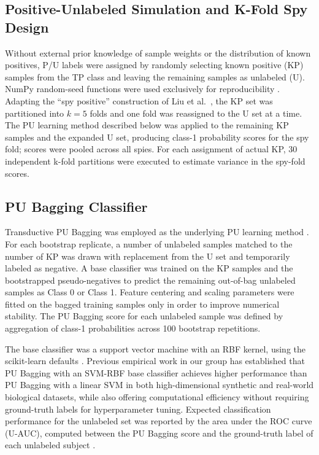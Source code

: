 \documentclass[11pt]{article}
\begin{document}
\subsection{Positive-Unlabeled Simulation and K-Fold Spy Design}

Without external prior knowledge of sample weights or the distribution of known positives, P/U labels were assigned by randomly selecting known positive (KP) samples from the TP class and leaving the remaining samples as unlabeled (U). NumPy random-seed functions were used exclusively for reproducibility \cite{harris2020numpy}. Adapting the ``spy positive'' construction of Liu et al.\ \cite{liu2003spy}, the KP set was partitioned into $k = 5$ folds and one fold was reassigned to the U set at a time. The PU learning method described below was applied to the remaining KP samples and the expanded U set, producing class-1 probability scores for the spy fold; scores were pooled across all spies. For each assignment of actual KP, 30 independent k-fold partitions were executed to estimate variance in the spy-fold scores.

\subsection{PU Bagging Classifier}

Transductive PU Bagging was employed as the underlying PU learning method \cite{mordelet2014bagging,breiman1996bagging}. For each bootstrap replicate, a number of unlabeled samples matched to the number of KP was drawn with replacement from the U set and temporarily labeled as negative. A base classifier was trained on the KP samples and the bootstrapped pseudo-negatives to predict the remaining out-of-bag unlabeled samples as Class 0 or Class 1. Feature centering and scaling parameters were fitted on the bagged training samples only in order to improve numerical stability. The PU Bagging score for each unlabeled sample was defined by aggregation of class-1 probabilities across 100 bootstrap repetitions.

The base classifier was a support vector machine with an RBF kernel, using the scikit-learn defaults \cite{pedregosa2011scikit}. Previous empirical work in our group has established that PU Bagging with an SVM-RBF base classifier achieves higher performance than PU Bagging with a linear SVM in both high-dimensional synthetic and real-world biological datasets, while also offering computational efficiency without requiring ground-truth labels for hyperparameter tuning. Expected classification performance for the unlabeled set was reported by the area under the ROC curve (U-AUC), computed between the PU Bagging score and the ground-truth label of each unlabeled subject \cite{hanley1982auc}.
\end{document}
